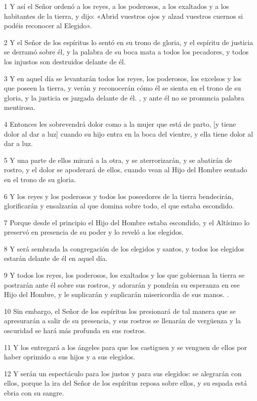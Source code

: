 \par 1 Y así el Señor ordenó a los reyes, a los poderosos, a los exaltados y a los habitantes de la tierra, y dijo: «Abrid vuestros ojos y alzad vuestros cuernos si podéis reconocer al Elegido».
\par 2 Y el Señor de los espíritus lo sentó en su trono de gloria, y el espíritu de justicia se derramó sobre él, y la palabra de su boca mata a todos los pecadores, y todos los injustos son destruidos delante de él.
\par 3 Y en aquel día se levantarán todos los reyes, los poderosos, los excelsos y los que poseen la tierra, y verán y reconocerán cómo él se sienta en el trono de su gloria, y la justicia es juzgada delante de él. , y ante él no se pronuncia palabra mentirosa.
\par 4 Entonces les sobrevendrá dolor como a la mujer que está de parto, [y tiene dolor al dar a luz] cuando su hijo entra en la boca del vientre, y ella tiene dolor al dar a luz.
\par 5 Y una parte de ellos mirará a la otra, y se aterrorizarán, y se abatirán de rostro, y el dolor se apoderará de ellos, cuando vean al Hijo del Hombre sentado en el trono de su gloria.
\par 6 Y los reyes y los poderosos y todos los poseedores de la tierra bendecirán, glorificarán y ensalzarán al que domina sobre todo, el que estaba escondido.
\par 7 Porque desde el principio el Hijo del Hombre estaba escondido, y el Altísimo lo preservó en presencia de su poder y lo reveló a los elegidos.
\par 8 Y será sembrada la congregación de los elegidos y santos, y todos los elegidos estarán delante de él en aquel día.
\par 9 Y todos los reyes, los poderosos, los exaltados y los que gobiernan la tierra se postrarán ante él sobre sus rostros, y adorarán y pondrán su esperanza en ese Hijo del Hombre, y le suplicarán y suplicarán misericordia de sus manos. .
\par 10 Sin embargo, el Señor de los espíritus los presionará de tal manera que se apresurarán a salir de su presencia, y sus rostros se llenarán de vergüenza y la oscuridad se hará más profunda en sus rostros.
\par 11 Y los entregará a los ángeles para que los castiguen y se venguen de ellos por haber oprimido a sus hijos y a sus elegidos.
\par 12 Y serán un espectáculo para los justos y para sus elegidos: se alegrarán con ellos, porque la ira del Señor de los espíritus reposa sobre ellos, y su espada está ebria con su sangre.
